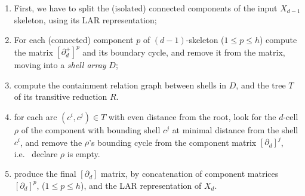 \begin{enumerate}

\item
First, we have to split the (isolated) connected components of the input $X_{d-1}$ skeleton, using its LAR representation; 

\item
For each (connected) component $p$ of $(d-1)$-skeleton ($1\leq p\leq h$) compute the matrix $[\partial_d^+]^p$ and its boundary cycle, and remove it  from the matrix, moving into a \emph{shell array} $D$;

\item
compute the containment relation graph between shells in $D$, and the tree $T$ of its transitive reduction $R$.

\item 
for each arc $(c^i , c^j )\in T$ with even distance from the root,   look for the $d$-cell $\rho$ of {the component with bounding shell} $c^j$ {at minimal distance from the shell $c^i$}, and 
remove the $\rho$'s {bounding cycle} from the component matrix $[\partial_d]^j$, i.e.~ declare $\rho$ is empty.

\item produce the final $[\partial_d]$ matrix, by concatenation of component matrices $[\partial_d]^p$, ($1\leq p\leq h$), and the LAR representation of $X_d$.

\end{enumerate}

